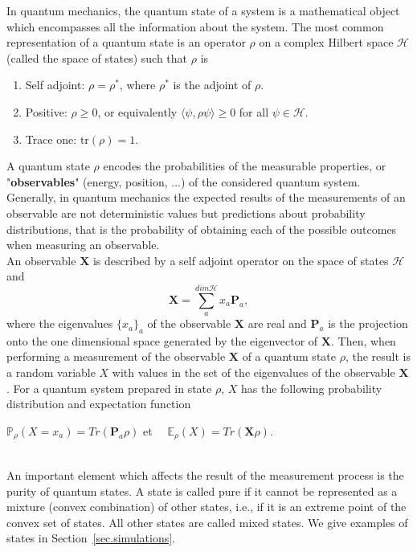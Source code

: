 \documentclass[a4paper]{amsart}
\newcommand{\Tr}{\text{tr}}
\begin{document}
In quantum mechanics, the quantum state of a system is a mathematical object 
which encompasses all the information about the system.  The most common
representation of a quantum state is an operator $\rho$ on a complex Hilbert
space $\mathcal{H}$ (called the space of states) such that $\rho$ is  
\begin{enumerate}
     \item Self adjoint: $\rho=\rho^{*}$, where $\rho^{*}$ is the adjoint of
$\rho$.
     \item Positive: $\rho\geq 0$, or equivalently
$\langle\psi,\rho\psi\rangle\geq0$ for all 
               $\psi\in \mathcal  {H}$.
     \item Trace one: $\Tr(\rho)=1$.
\end{enumerate}
A quantum state $\rho$ encodes the probabilities of the measurable properties,
or "\textbf{observables}" (energy, position, ...) of the considered quantum
system. Generally, in quantum mechanics the expected results of the measurements
of an observable are not  deterministic values but  predictions about
probability distributions, that is the probability of obtaining each of the
possible outcomes when measuring an observable. \\
An observable $\mathbf{X}$ is described by a self adjoint operator on the space
of states $\mathcal{H}$ and
$$
\mathbf{X}=\sum_{a}^{dim\mathcal{H}}x_a\mathbf{P}_a,
$$
where the eigenvalues $\{x_a\}_a$ of the observable $\mathbf{X}$ are real and 
$\mathbf{P}_a$  is the projection onto the one dimensional space generated by
the eigenvector of $\mathbf{X}$. Then, when performing a measurement of the
observable $\mathbf{X}$ of a quantum state $\rho$, the result is a random
variable $X$ with values in the set of the eigenvalues of the observable
$\mathbf{X}$. For a quantum system prepared in state $\rho$,  $X$ has the
following probability distribution and expectation  function
%
\begin{center}
$\mathbb{P}_\rho(X=x_a)=Tr(\mathbf{P}_a\rho)$ et
$\quad\mathbb{E}_\rho(X)=Tr(\mathbf{X}\rho)$.
\end{center}
%
\noindent\\
 An important element which affects the result of the measurement process is the
purity of quantum states. A state is called pure if it cannot be represented as
a mixture (convex combination) of other states, i.e., if it is an extreme point
of the convex set of states. All other states are called mixed states. We give
examples of states in Section~\ref{sec.simulations}.
\end{document}
